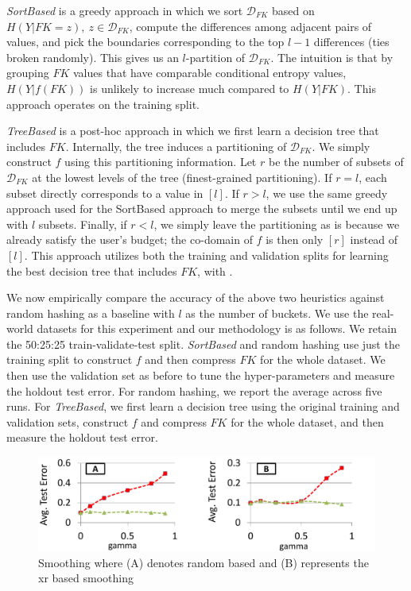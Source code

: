 \documentclass[sigconf]{acmart}
\begin{document}
\textit{SortBased} is a greedy approach in which we sort $\mathcal{D}_{FK}$ based on $H(Y|FK=z), ~z \in \mathcal{D}_{FK}$, compute the differences among adjacent pairs of values, and pick the boundaries corresponding to the top $l-1$ differences (ties broken randomly). This gives us an $l$-partition of $\mathcal{D}_{FK}$. The intuition is that by grouping $FK$ values that have comparable conditional entropy values, $H(Y|f(FK))$ is unlikely to increase much compared to $H(Y|FK)$. This approach operates on the training split.

\textit{TreeBased} is a post-hoc approach in which we first learn a decision tree that includes $FK$. Internally, the tree induces a partitioning of 
$\mathcal{D}_{FK}$. We simply construct $f$ using this partitioning information. Let $r$ be the number of subsets of $\mathcal{D}_{FK}$ at the lowest levels of the tree 
(finest-grained partitioning). If $r = l$, each subset directly corresponds to a value in $[l]$. If $r > l$, we use the same greedy approach used for the SortBased 
approach to merge the subsets until we end up with $l$ subsets. Finally, if $r < l$, we simply leave the partitioning as is because we already satisfy the user's budget;
the co-domain of $f$ is then only $[r]$ instead of $[l]$. This approach utilizes both the training and validation splits for learning the best decision tree that includes $FK$, with .

We now empirically compare the accuracy of the above two heuristics against random hashing as a baseline with $l$ as the number of buckets. 
We use the real-world datasets for this experiment and our methodology is as follows. We retain the 50:25:25 train-validate-test split.
\textit{SortBased} and random hashing use just the training split to construct $f$ and then compress $FK$ for the whole dataset. We then use
the validation set as before to tune the hyper-parameters and measure the holdout test error. For random hashing, we report the average across 
five runs. For \textit{TreeBased}, we first learn a decision tree using the original training and validation sets, construct $f$ and compress 
$FK$ for the whole dataset, and then measure the holdout test error.

\begin{figure}
\centering
\includegraphics[width=\columnwidth,height=\textheight,keepaspectratio]{smoothing.pdf}
\caption{Smoothing where (A) denotes random based and (B) represents the xr based smoothing}
\label{Figure:OneXr1nnSVMSimulation}
\end{figure}
\end{document}
